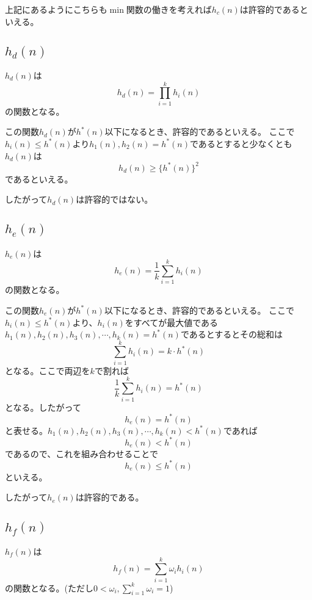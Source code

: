 \documentclass[a4paper,11pt,dvipdfmx]{jsarticle}
\begin{document}
上記にあるようにこちらも$\min$関数の働きを考えれば$h_c(n)$は許容的であるといえる。

\subsection{$h_d(n)$}
$h_d(n)$は
\begin{equation*}
    h_d(n) = \prod_{i=1}^{k}h_i(n)
\end{equation*}
の関数となる。

この関数$h_d(n)$が$h^*(n)$以下になるとき、許容的であるといえる。
ここで$h_i(n) \leq h^*(n)$より$h_1(n), h_2(n) = h^*(n)$であるとすると少なくとも$h_d(n)$は
\begin{equation*}
    h_d(n) \geq \{h^*(n)\}^2
\end{equation*}
であるといえる。

したがって$h_d(n)$は許容的ではない。

\subsection{$h_e(n)$}
$h_e(n)$は
\begin{equation*}
    h_e(n) = \frac{1}{k}\sum_{i=1}^{k}h_i(n)
\end{equation*}
の関数となる。

この関数$h_e(n)$が$h^*(n)$以下になるとき、許容的であるといえる。
ここで$h_i(n) \leq h^*(n)$より、$h_i(n)$をすべてが最大値である$h_1(n),h_2(n),h_3(n),\cdots,h_k(n) = h^*(n)$であるとするとその総和は
\begin{equation*}
    \sum_{i=1}^{k}h_i(n) = k \cdot h^*(n)
\end{equation*}
となる。ここで両辺を$k$で割れば
\begin{equation*}
    \frac{1}{k}\sum_{i=1}^{k}h_i(n) = h^*(n)
\end{equation*}
となる。したがって
\begin{equation*}
    h_e(n) = h^*(n)
\end{equation*}
と表せる。$h_1(n),h_2(n),h_3(n),\cdots,h_k(n) < h^*(n)$であれば
\begin{equation*}
    h_e(n) < h^*(n)
\end{equation*}
であるので、これを組み合わせることで
\begin{equation*}
    h_e(n) \leq h^*(n)
\end{equation*}
といえる。

したがって$h_e(n)$は許容的である。

\subsection{$h_f(n)$}
$h_f(n)$は
\begin{equation*}
    h_f(n) = \sum_{i=1}^{k}\omega_i h_i(n)
\end{equation*}
の関数となる。(ただし$0<\omega_i,\sum_{i=1}^{k}\omega_i = 1$)
\end{document}
